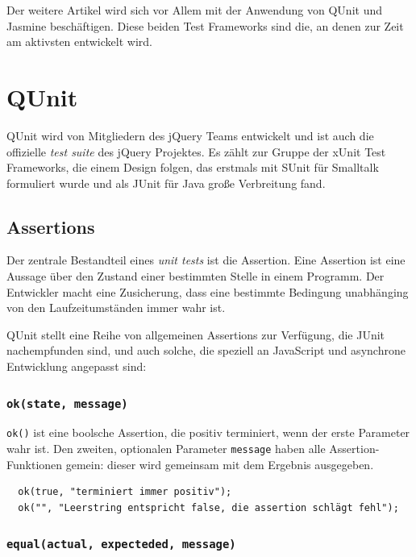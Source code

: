 \documentclass[11pt, a4paper]{article}
\begin{document}
Der weitere Artikel wird sich vor Allem mit der Anwendung von QUnit und Jasmine
beschäftigen. Diese beiden Test Frameworks sind die, an denen zur Zeit am
aktivsten entwickelt wird.

\section{QUnit}

QUnit\cite{zaefferer_qunit_2011} wird von Mitgliedern des jQuery
Teams\cite{resig_jquery_2011} entwickelt und ist auch die offizielle
\emph{test suite} des jQuery Projektes. Es zählt zur Gruppe der
xUnit Test Frameworks\cite{fowler_xunit_2010}, die einem Design folgen,
das erstmals mit SUnit\cite{beck_simple_1994} für Smalltalk formuliert
wurde und als JUnit\cite{gamma_junit_2011} für Java große Verbreitung fand.

\subsection{Assertions}

Der zentrale Bestandteil eines \emph{unit tests} ist die Assertion. Eine
Assertion ist eine Aussage über den Zustand einer bestimmten Stelle in
einem Programm\cite{wikipedia_assertion_2011}. Der Entwickler macht eine
Zusicherung, dass eine bestimmte Bedingung unabhänging von den Laufzeitumständen
immer wahr ist.

QUnit stellt eine Reihe von allgemeinen Assertions zur Verfügung,
die JUnit nachempfunden sind, und auch solche, die speziell an JavaScript
und asynchrone Entwicklung angepasst sind\cite{zaefferer_qunit_2011}:

\subsubsection*{\texttt{ok(state, message)}}

\texttt{ok()} ist eine boolsche Assertion, die positiv terminiert, wenn der
erste Parameter wahr ist. Den zweiten, optionalen Parameter \texttt{message} haben alle
Assertion-Funktionen gemein: dieser wird gemeinsam mit dem Ergebnis
ausgegeben.

\begin{verbatim}
  ok(true, "terminiert immer positiv");
  ok("", "Leerstring entspricht false, die assertion schlägt fehl");
\end{verbatim}

\subsubsection*{\texttt{equal(actual, expecteded, message)}}
\end{document}

